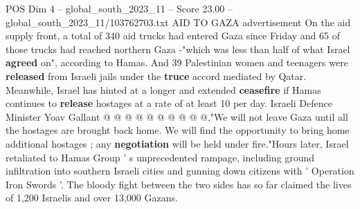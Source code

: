 \begin{textsample}{POS Dim 4 – global\_south\_2023\_11 – Score 23.00 – global\_south\_2023\_11/103762703.txt}
AID TO GAZA advertisement On the aid supply front, a total of 340 aid trucks had entered Gaza since Friday and 65 of those trucks had reached northern Gaza -"which was less than half of what Israel \textbf{agreed} on", according to Hamas.
And 39 Palestinian women and teenagers were \textbf{released} from Israeli jails under the \textbf{truce} accord mediated by Qatar.
Meanwhile, Israel has hinted at a longer and extended \textbf{ceasefire} if Hamas continues to \textbf{release} hostages at a rate of at least 10 per day.
Israeli Defence Minister Yoav Gallant @ @ @ @ @ @ @ @ @ @,"We will not leave Gaza until all the hostages are brought back home.
We will find the opportunity to bring home additional hostages ; any \textbf{negotiation} will be held under fire."Hours later, Israel retaliated to Hamas Group ' s unprecedented rampage, including ground infiltration into southern Israeli cities and gunning down citizens with ' Operation Iron Swords '.
The bloody fight between the two sides has so far claimed the lives of 1,200 Israelis and over 13,000 Gazans.

\end{textsample}
